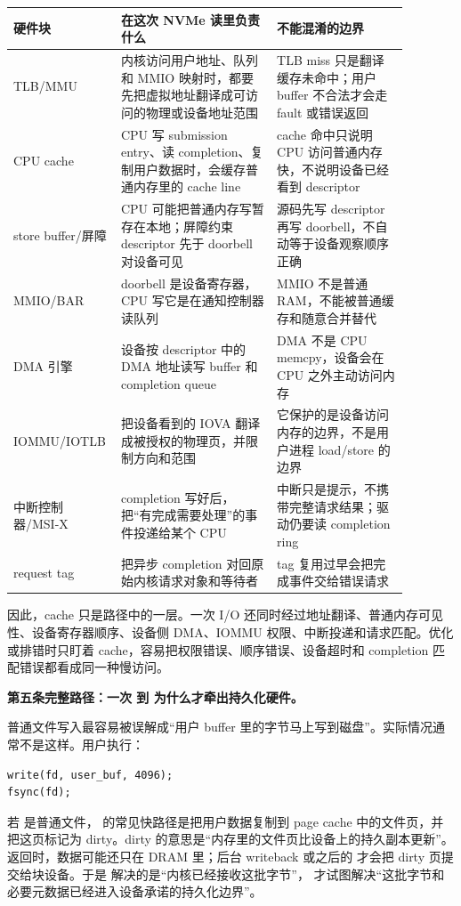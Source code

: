 \begin{longtable}{p{0.18\linewidth}p{0.38\linewidth}p{0.32\linewidth}}
\toprule
硬件块 & 在这次 NVMe 读里负责什么 & 不能混淆的边界 \\
\midrule
TLB/MMU & 内核访问用户地址、队列和 MMIO 映射时，都要先把虚拟地址翻译成可访问的物理或设备地址范围 & TLB miss 只是翻译缓存未命中；用户 buffer 不合法才会走 fault 或错误返回 \\
CPU cache & CPU 写 submission entry、读 completion、复制用户数据时，会缓存普通内存里的 cache line & cache 命中只说明 CPU 访问普通内存快，不说明设备已经看到 descriptor \\
store buffer/屏障 & CPU 可能把普通内存写暂存在本地；屏障约束 descriptor 先于 doorbell 对设备可见 & 源码先写 descriptor 再写 doorbell，不自动等于设备观察顺序正确 \\
MMIO/BAR & doorbell 是设备寄存器，CPU 写它是在通知控制器读队列 & MMIO 不是普通 RAM，不能被普通缓存和随意合并替代 \\
DMA 引擎 & 设备按 descriptor 中的 DMA 地址读写 buffer 和 completion queue & DMA 不是 CPU memcpy，设备会在 CPU 之外主动访问内存 \\
IOMMU/IOTLB & 把设备看到的 IOVA 翻译成被授权的物理页，并限制方向和范围 & 它保护的是设备访问内存的边界，不是用户进程 load/store 的边界 \\
中断控制器/MSI-X & completion 写好后，把“有完成需要处理”的事件投递给某个 CPU & 中断只是提示，不携带完整请求结果；驱动仍要读 completion ring \\
request tag & 把异步 completion 对回原始内核请求对象和等待者 & tag 复用过早会把完成事件交给错误请求 \\
\bottomrule
\end{longtable}

因此，cache 只是路径中的一层。一次 I/O 还同时经过地址翻译、普通内存可见性、设备寄存器顺序、设备侧 DMA、IOMMU 权限、中断投递和请求匹配。优化或排错时只盯着 cache，容易把权限错误、顺序错误、设备超时和 completion 匹配错误都看成同一种慢访问。

\medskip
\noindent\textbf{第五条完整路径：一次  到  为什么才牵出持久化硬件。}

普通文件写入最容易被误解成“用户 buffer 里的字节马上写到磁盘”。实际情况通常不是这样。用户执行：

\begin{lstlisting}
write(fd, user_buf, 4096);
fsync(fd);
\end{lstlisting}

若  是普通文件， 的常见快路径是把用户数据复制到 page cache 中的文件页，并把这页标记为 dirty。dirty 的意思是“内存里的文件页比设备上的持久副本更新”。 返回时，数据可能还只在 DRAM 里；后台 writeback 或之后的  才会把 dirty 页提交给块设备。于是  解决的是“内核已经接收这批字节”， 才试图解决“这批字节和必要元数据已经进入设备承诺的持久化边界”。

